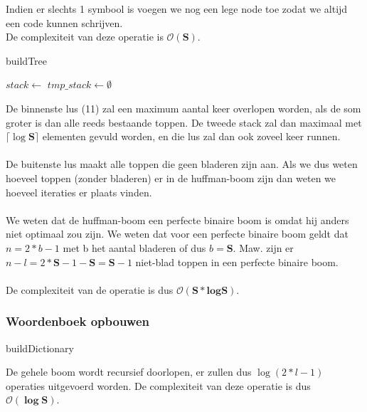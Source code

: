 \documentclass[a4paper,12pt]{report}
\newcommand{\bigO}[1]{$\bm{\mathcal{O}(#1)}$} %
\newcommand\ceil[1]{\lceil#1\rceil}
\begin{document}
Indien er slechts 1 symbool is voegen we nog een lege node toe zodat we altijd een code kunnen schrijven. \\
De complexiteit van deze operatie is \bigO{S}.

\begin{algorithm}[H]
\caption{buildTree}
\label{alg:buildTree}
\SetAlgoLined	
\DontPrintSemicolon
{}
$stack \gets $\;
$tmp\_stack \gets \emptyset$\;
\;
\Return {}
\end{algorithm}
De binnenste lus (11) zal een maximum aantal keer overlopen worden, als de som groter is dan alle reeds bestaande toppen. De tweede stack zal dan maximaal met $\ceil{\log\textbf{S}}$ elementen gevuld worden, en die lus zal dan ook zoveel keer runnen.\\ \\
De buitenste lus maakt alle toppen die geen bladeren zijn aan. Als we dus weten hoeveel toppen (zonder bladeren) er in de huffman-boom zijn dan weten we hoeveel iteraties er plaats vinden. \\ \\
We weten dat de huffman-boom een perfecte binaire boom is omdat hij anders niet optimaal zou zijn. We weten dat voor een perfecte binaire boom geldt dat $n=2*b-1$ met b het aantal bladeren of dus $b=\textbf{S}$. Maw. zijn er $n-l=2*\textbf{S}-1-\textbf{S}=\textbf{S}-1$ niet-blad toppen in een perfecte binaire boom.\\ \\
De complexiteit van de  operatie is dus \bigO{S*logS}.

\subsubsection{Woordenboek opbouwen}
\begin{algorithm}[H]
\caption{buildDictionary}
\SetAlgoLined	
\DontPrintSemicolon
{}
\end{algorithm}
De gehele boom wordt recursief doorlopen, er zullen dus $\log(2*l-1)$ operaties uitgevoerd worden. De complexiteit van deze operatie is dus \bigO{\log S}.
\end{document}
